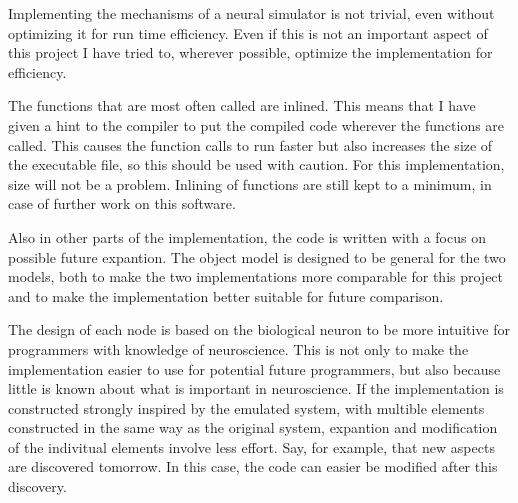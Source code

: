 
Implementing the mechanisms of a neural simulator is not trivial, even without optimizing it for run time efficiency.
Even if this is not an important aspect of this project I have tried to, wherever possible, optimize the implementation for efficiency.

The functions that are most often called are inlined. This means that I have given a hint to the compiler to put the compiled code wherever the functions are called.
This causes the function calls to run faster but also increases the size of the executable file, so this should be used with caution. %
For this implementation, size will not be a problem. %
Inlining of functions are still kept to a minimum, in case of further work on this software. %

Also in other parts of the implementation, the code is written with a focus on possible future expantion.
The object model is designed to be general for the two models, both to make the two implementations more comparable for this project and to make the implementation better suitable for future comparison.

The design of each node is based on the biological neuron to be more intuitive for programmers with knowledge of neuroscience. 
This is not only to make the implementation easier to use for potential future programmers, but also because little is known about what is important in neuroscience.
If the implementation is constructed strongly inspired by the emulated system, with multible elements constructed in the same way as the original system, expantion and modification of the indivitual elements involve less effort.
Say, for example, that new aspects are discovered tomorrow. In this case, the code can easier be modified after this discovery.

